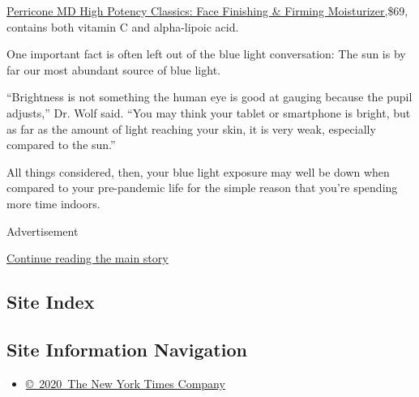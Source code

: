 \href{https://www.perriconemd.com/products/face-finishing-firming-moisturizer-51090023}{Perricone
MD High Potency Classics: Face Finishing \& Firming Moisturizer,}\$69,
contains both vitamin C and alpha-lipoic acid.

One important fact is often left out of the blue light conversation: The
sun is by far our most abundant source of blue light.

``Brightness is not something the human eye is good at gauging because
the pupil adjusts,'' Dr. Wolf said. ``You may think your tablet or
smartphone is bright, but as far as the amount of light reaching your
skin, it is very weak, especially compared to the sun.''

All things considered, then, your blue light exposure may well be down
when compared to your pre-pandemic life for the simple reason that
you're spending more time indoors.

Advertisement

\protect\hyperlink{after-bottom}{Continue reading the main story}

\hypertarget{site-index}{%
\subsection{Site Index}\label{site-index}}

\hypertarget{site-information-navigation}{%
\subsection{Site Information
Navigation}\label{site-information-navigation}}

\begin{itemize}
\tightlist
\item
  \href{https://help.nytimes.com/hc/en-us/articles/115014792127-Copyright-notice}{©~2020~The
  New York Times Company}
\end{itemize}

